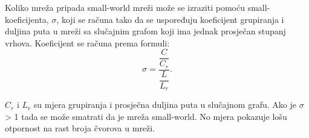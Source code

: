 Koliko mreža pripada small-world mreži može se izraziti pomoću small-koeficijenta, \textit{$\sigma$}, koji se računa tako da se uspoređuju koeficijent grupiranja i duljina puta u mreži sa slučajnim grafom koji ima jednak prosječan stupanj vrhova. Koeficijent se računa prema formuli:
\begin{equation}
 \sigma = \dfrac{\dfrac{C}{C_{r}}}{\dfrac{L}{L_{r}}}.
\end{equation}

$ C_{r} $ i $ L_{r} $ su mjera grupiranja i prosječna duljina puta u slučajnom grafu. Ako je $ \sigma $ > 1 tada se može smatrati da je mreža small-world. No mjera pokazuje lošu otpornost na rast broja čvorova u mreži.
